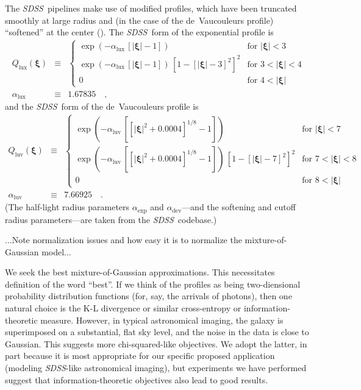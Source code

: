 \documentclass[12pt,pdftex,preprint]{aastex}
\newcommand{\project}[1]{\textsl{#1}}
\newcommand{\sdss}{\project{SDSS}}
\newcommand{\tvector}[1]{\boldsymbol{#1}}
\newcommand{\spos}{\tvector{\xi}}
\newcommand{\dev}{\mathrm{dev}}
\newcommand{\lux}{\mathrm{lux}}
\newcommand{\luv}{\mathrm{luv}}
\begin{document}
The \sdss\ pipelines make use of modified profiles, which have been
truncated smoothly at large radius and (in the case of the
de~Vaucouleurs profile) ``softened'' at the center (\citealt{lupton}).
The \sdss\ form of the exponential profile is
\begin{eqnarray}\displaystyle
Q_{\lux}(\spos) &\equiv& \left\{\begin{array}{ll}
  \exp(-\alpha_{\lux}\,[|\spos| - 1]) & \mbox{for~}|\spos| < 3 \\
  \exp(-\alpha_{\lux}\,[|\spos| - 1])
  \,\left[1 - [|\spos| - 3]^2\right]^2 & \mbox{for~}3 < |\spos| < 4 \\
  0                                   & \mbox{for~}4 < |\spos|
\end{array}\right.
\\
\alpha_{\lux} &\equiv& 1.67835
\quad ,
\end{eqnarray}
and the \sdss\ form of the de~Vaucouleurs profile is
\begin{eqnarray}\displaystyle
Q_{\luv}(\spos) &\equiv& \left\{\begin{array}{ll}
  \exp(-\alpha_{\luv}\,\left[[|\spos|^2 + 0.0004]^{1/8} - 1\right]) & \mbox{for~}|\spos| < 7 \\
  \exp(-\alpha_{\luv}\,\left[[|\spos|^2 + 0.0004]^{1/8} - 1\right])
  \,\left[1 - [|\spos| - 7]^2\right]^2 & \mbox{for~}7 < |\spos| < 8 \\
  0                                   & \mbox{for~}8 < |\spos|
\end{array}\right.
\\
\alpha_{\luv} &\equiv& 7.66925
\quad .
\end{eqnarray}
(The half-light radius parameters $\alpha_{\exp}$ and
$\alpha_{\dev}$---and the softening and cutoff radius parameters---are
taken from the \sdss\ codebase.)

...Note normalization issues and how easy it is to normalize the mixture-of-Gaussian model...

We seek the best mixture-of-Gaussian approximations.  This
necessitates definition of the word ``best''.  If we think of the
profiles as being two-diensional probability distribution functions
(for, say, the arrivals of photons), then one natural choice is the
K-L divergence or similar cross-entropy or information-theoretic
measure.  However, in typical astronomical imaging, the galaxy is
superimposed on a substantial, flat sky level, and the noise in the
data is close to Gaussian.  This suggests more chi-squared-like
objectives.  We adopt the latter, in part because it is most
appropriate for our specific proposed application (modeling \sdss-like
astronomical imaging), but experiments we have performed suggest that
information-theoretic objectives also lead to good results.
\end{document}
